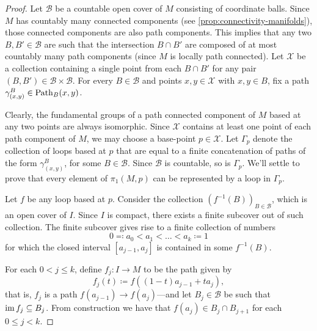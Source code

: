 \begin{proof}
    Let \(\mathcal{B}\) be a countable open cover of \(M\) consisting of coordinate
    balls. Since \(M\) has countably many connected components (see
    \cref{prop:connectivity-manifolds}), those connected components are also path
    components. This implies that any two \(B, B' \in \mathcal{B}\) are such that
    the intersection \(B \cap B'\) are composed of at most countably many path
    components (since \(M\) is locally path connected). Let \(\mathcal{X}\) be a
    collection containing a single point from each \(B \cap B'\) for any pair
    \((B, B') \in \mathcal{B} \times \mathcal{B}\). For every \(B \in \mathcal{B}\)
    and points \(x, y \in \mathcal{X}\) with \(x, y \in B\), fix a path
    \(\gamma_{(x, y)}^B \in \operatorname{Path}_B(x, y)\).

    Clearly, the fundamental groups of a path connected component of \(M\) based at
    any two points are always isomorphic. Since \(\mathcal{X}\) contains at least
    one point of each path component of \(M\), we may choose a base-point
    \(p \in \mathcal{X}\). Let \(\Gamma_p\) denote the collection of loops based at
    \(p\) that are equal to a finite concatenation of paths of the form
    \(\gamma_{(x, y)}^B\), for some \(B \in \mathcal{B}\). Since \(\mathcal{B}\) is
    countable, so is \(\Gamma_p\). We'll settle to prove that every element of
    \(\pi_1(M, p)\) can be represented by a loop in \(\Gamma_p\).

    Let \(f\) be any loop based at \(p\). Consider the collection
    \((f^{-1}(B))_{B \in \mathcal{B}}\), which is an open cover of \(I\). Since
    \(I\) is compact, there exists a finite subcover out of such collection. The
    finite subcover gives rise to a finite collection of numbers
    \[
        0 \eqqcolon a_0 < a_1 < \dots < a_k \coloneq 1
    \]
    for which the closed interval \([a_{j-1}, a_j]\) is contained in some
    \(f^{-1}(B)\).

    For each \(0 < j \leq k\), define \(f_j: I \to M\) to be the path given by
    \[
        f_j(t) \coloneq f((1 - t) a_{j-1} + t a_j),
    \]
    that is, \(f_j\) is a path \(f(a_{j-1}) \to f(a_j)\)---and let
    \(B_j \in \mathcal{B}\) be such that \(\operatorname{im} f_j \subseteq B_j\). From
    construction we have that \(f(a_j) \in B_j \cap B_{j+1}\) for each
    \(0 \leq j < k\).


\end{proof}
